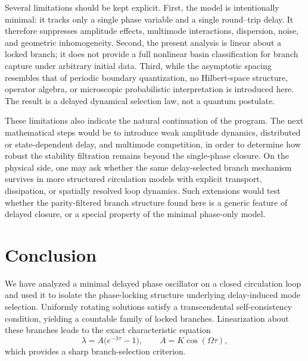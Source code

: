 \documentclass[11pt,a4paper]{article}
\begin{document}
    Several limitations should be kept explicit. First, the model is intentionally minimal: it tracks only a single phase variable and a single round--trip delay. It therefore suppresses amplitude effects, multimode interactions, dispersion, noise, and geometric inhomogeneity. Second, the present analysis is linear about a locked branch; it does not provide a full nonlinear basin classification for branch capture under arbitrary initial data. Third, while the asymptotic spacing resembles that of periodic boundary quantization, no Hilbert-space structure, operator algebra, or microscopic probabilistic interpretation is introduced here. The result is a delayed dynamical selection law, not a quantum postulate.
    
    These limitations also indicate the natural continuation of the program. The next mathematical steps would be to introduce weak amplitude dynamics, distributed or state-dependent delay, and multimode competition, in order to determine how robust the stability filtration remains beyond the single-phase closure. On the physical side, one may ask whether the same delay-selected branch mechanism survives in more structured circulation models with explicit transport, dissipation, or spatially resolved loop dynamics. Such extensions would test whether the parity-filtered branch structure found here is a generic feature of delayed closure, or a special property of the minimal phase-only model.
    
    \section{Conclusion}
    \label{sec:conclusion}
    
    We have analyzed a minimal delayed phase oscillator on a closed circulation loop and used it to isolate the phase-locking structure underlying delay-induced mode selection. Uniformly rotating solutions satisfy a transcendental self-consistency condition, yielding a countable family of locked branches. Linearization about these branches leads to the exact characteristic equation
    \begin{equation}
        \lambda = A\big(e^{-\lambda\tau}-1\big),
        \qquad
        A=K\cos(\Omega\tau),
    \end{equation}
    which provides a sharp branch-selection criterion.
    
\end{document}
